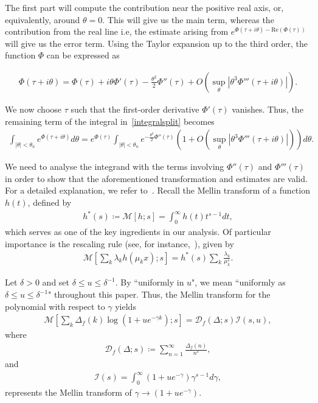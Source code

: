 \documentclass[12pt, oneside,reqno]{amsart}
\numberwithin{equation}{section}
\begin{document}
\noindent
The first part will compute the contribution near the positive real axis, or, equivalently, around $\theta=0$. This will give us the main term, whereas the contribution from the real line i.e, the estimate arising from $e^{\Phi(\tau+i\theta)-\mathrm{Re}(\Phi(\tau))}$ will give us the error term. Using the Taylor expansion up to the third order, the function $\Phi$ can be expressed as

\begin{align}\label{taylorapproximation}
\Phi(\tau+i\theta)
=\Phi(\tau)+i\theta\Phi'(\tau)-\frac{\theta^2}{2}\Phi''(\tau)+O\left(\sup_{\theta}\left|\theta^3\Phi'''(\tau+i\theta)\right|\right).
\end{align}

\noindent
We now choose $\tau$ such that the first-order derivative $\Phi'(\tau)$ vanishes. Thus, the remaining term of the integral in~\eqref{integralsplit} becomes
\begin{align*}
\int_{|\theta|<\theta_n} e^{\Phi(\tau+i\theta)}d\theta
=e^{\Phi(\tau)}\int_{|\theta|<\theta_n} e^{-\tfrac{\theta^2}{2}\Phi''(\tau)}\left(1+O\left(\sup_{\theta}\left|\theta^3\Phi'''(\tau+i\theta)\right|\right)\right) d\theta.
\end{align*}

\noindent
We need to analyse the integrand with the terms involving $\Phi''(\tau)$ and $\Phi'''(\tau)$ in order to show that the aforementioned transformation and estimates are valid. For a detailed explanation, we refer to~\cite[\S3]{lipniketal}. Recall the Mellin transform of a function $h(t)$, defined by
\begin{align*}
h^{*}(s)
\coloneqq\mathcal{M}[h;s]
=\int_{0}^{\infty}h(t)t^{s-1}dt,
\end{align*}
which serves as one of the key ingredients in our analysis. Of particular importance is the rescaling rule (see, for instance,~\cite[Theorem 1]{flajoletetal}), given by
\begin{align*}
\mathcal{M}\left[\sum_{k}\lambda_kh(\mu_kx);s\right]
=h^{*}(s)\sum_{k}\frac{\lambda_k}{\mu_k^s}.
\end{align*}

\noindent
Let $\delta>0$ and set $\delta\leq u\leq \delta^{-1}$. By ``uniformly in $u$", we mean ``uniformly as $\delta\leq u\leq \delta^{-1}$" throughout this paper. Thus, the Mellin transform for the polynomial with respect to $\gamma$ yields
\begin{align*}
\mathcal{M}\left[\sum_{k}\Delta_f(k)\log(1+ue^{-\gamma k});s\right]   
=\mathcal{D}_f(\Delta;s)\mathcal{I}(s,u),
\end{align*}
where
\begin{align}\label{dirichletserieswithG}
\mathcal{D}_f(\Delta;s)
\coloneqq \sum_{n=1}^{\infty}\frac{\Delta_f(n)}{n^s}, 
\end{align}
and
\begin{align*}
\mathcal{I}(s)
=\int_{0}^{\infty} (1+ue^{-\gamma})\gamma^{s-1}d\gamma,      
\end{align*}
represents the Mellin transform of $\gamma\to(1+ue^{-\gamma})$.
\end{document}
